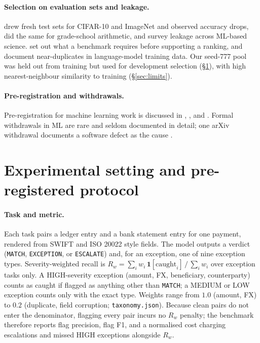 \documentclass[11pt]{article}
\begin{document}
\paragraph{Selection on evaluation sets and leakage.} \citet{recht2019imagenet} drew fresh test sets for CIFAR-10 and ImageNet and observed accuracy drops, \citet{zhang2024gsm1k} did the same for grade-school arithmetic, and \citet{kapoor2022leakage} survey leakage across ML-based science. \citet{bowman2021benchmarking} set out what a benchmark requires before supporting a ranking, and \citet{lee2021dedup} document near-duplicates in language-model training data. Our seed-777 pool was held out from training but used for development selection (\S\ref{sec:setting}), with high nearest-neighbour similarity to training (\S\ref{sec:limits}).

\paragraph{Pre-registration and withdrawals.} Pre-registration for machine learning work is discussed in \citet{vanmiltenburg2021prereg}, \citet{hofman2023prereg}, and \citet{bell2021psychology}. Formal withdrawals in ML are rare and seldom documented in detail; one arXiv withdrawal documents a software defect as the cause \citep{pietrowski2021gpu}.

\section{Experimental setting and pre-registered protocol}
\label{sec:setting}

\paragraph{Task and metric.} Each task pairs a ledger entry and a bank statement entry for one payment, rendered from SWIFT and ISO 20022 style fields. The model outputs a verdict (\texttt{MATCH}, \texttt{EXCEPTION}, or \texttt{ESCALATE}) and, for an exception, one of nine exception types. Severity-weighted recall is $R_w = \sum_i w_i\,\mathbf 1[\text{caught}_i] \,/\, \sum_i w_i$ over exception tasks only. A HIGH-severity exception (amount, FX, beneficiary, counterparty) counts as caught if flagged as anything other than \texttt{MATCH}; a MEDIUM or LOW exception counts only with the exact type. Weights range from $1.0$ (amount, FX) to $0.2$ (duplicate, field corruption; \texttt{taxonomy.json}). Because clean pairs do not enter the denominator, flagging every pair incurs no $R_w$ penalty; the benchmark therefore reports flag precision, flag F1, and a normalised cost charging escalations and missed HIGH exceptions alongside $R_w$.
\end{document}
